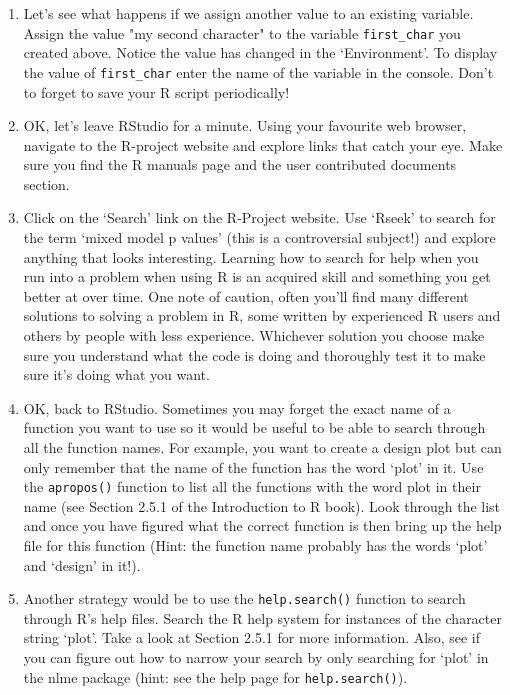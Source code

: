 \documentclass[12pt]{article}
\begin{document}
\begin{enumerate}
 

\item Let’s see what happens if we assign another value to an existing variable. Assign the value "my second character" to the variable \verb|first_char| you created above. Notice the value has changed in the ‘Environment’. To display the value of \verb|first_char| enter the name of the variable in the console. Don’t to forget to save your R script periodically!

 

\item OK, let’s leave RStudio for a minute. Using your favourite web browser, navigate to the R-project website and explore links that catch your eye. Make sure you find the R manuals page and the user contributed documents section.
 

\item Click on the ‘Search’ link on the R-Project website. Use ‘Rseek’ to search for the term ‘mixed model p values’ (this is a controversial subject!) and explore anything that looks interesting. Learning how to search for help when you run into a problem when using R is an acquired skill and something you get better at over time. One note of caution, often you’ll find many different solutions to solving a problem in R, some written by experienced R users and others by people with less experience. Whichever solution you choose make sure you understand what the code is doing and thoroughly test it to make sure it’s doing what you want.

 

\item OK, back to RStudio. Sometimes you may forget the exact name of a function you want to use so it would be useful to be able to search through all the function names. For example, you want to create a design plot but can only remember that the name of the function has the word ‘plot’ in it. Use the {\tt apropos()} function to list all the functions with the word plot in their name (see Section 2.5.1 of the Introduction to R book). Look through the list and once you have figured what the correct function is then bring up the help file for this function (Hint: the function name probably has the words ‘plot’ and ‘design’ in it!).

 

\item Another strategy would be to use the {\tt help.search()} function to search through R’s help files. Search the R help system for instances of the character string ‘plot’. Take a look at Section 2.5.1 for more information. Also, see if you can figure out how to narrow your search by only searching for ‘plot’ in the nlme package (hint: see the help page for {\tt help.search()}).


\end{enumerate}
\end{document}
